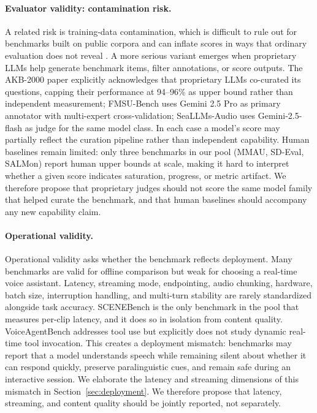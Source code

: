 \paragraph{Evaluator validity: contamination risk.}
A related risk is training-data contamination, which is difficult to rule
out for benchmarks built on public corpora and can inflate scores in ways
that ordinary evaluation does not reveal \citep{deng2024contamination}. A
more serious variant emerges when proprietary LLMs
help generate benchmark items, filter annotations, or score outputs. The
AKB-2000 paper \citep{lu2026akb2000} explicitly acknowledges that
proprietary LLMs co-curated its questions, capping their performance at
94--96\% as upper bound rather than independent measurement; FMSU-Bench
\citep{li2026fmsubench} uses Gemini 2.5 Pro as primary annotator with
multi-expert cross-validation; SeaLLMs-Audio uses Gemini-2.5-flash as
judge for the same model class. In each case a model's score may
partially reflect the curation pipeline rather than independent
capability. Human baselines remain limited: only three benchmarks in our
pool (MMAU, SD-Eval, SALMon) report human upper bounds at scale, making
it hard to interpret whether a given score indicates saturation,
progress, or metric artifact. We therefore propose that proprietary
judges should not score the same model family that helped curate the
benchmark, and that human baselines should accompany any new capability
claim.

\paragraph{Operational validity.}
Operational validity asks whether the benchmark reflects deployment. Many
benchmarks are valid for offline comparison but weak for choosing a
real-time voice assistant. Latency, streaming mode, endpointing, audio
chunking, hardware, batch size, interruption handling, and multi-turn
stability are rarely standardized alongside task accuracy. SCENEBench
\citep{iyer2026scenebench} is the only benchmark in the pool that
measures per-clip latency, and it does so in isolation from content
quality. VoiceAgentBench \citep{jain2025voiceagentbench} addresses tool
use but explicitly does not study dynamic real-time tool invocation.
This creates a deployment mismatch: benchmarks may report that a model
understands speech while remaining silent about whether it can respond
quickly, preserve paralinguistic cues, and remain safe during an
interactive session. We elaborate the latency and streaming dimensions
of this mismatch in Section~\ref{sec:deployment}. We therefore
propose that latency, streaming, and content quality should be jointly
reported, not separately.

